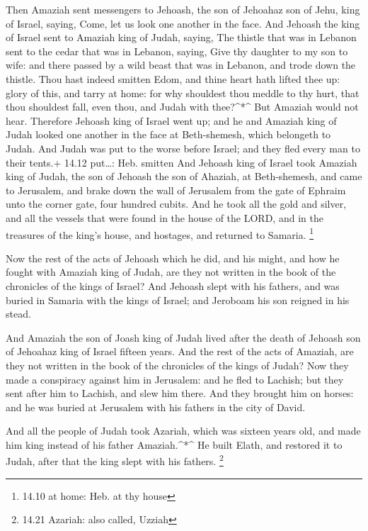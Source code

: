  Then Amaziah sent messengers to Jehoash, the son of
Jehoahaz son of Jehu, king of Israel, saying, Come, let us look one
another in the face.  And Jehoash the king of Israel sent to
Amaziah king of Judah, saying, The thistle that was in Lebanon sent to
the cedar that was in Lebanon, saying, Give thy daughter to my son to
wife: and there passed by a wild beast that was in Lebanon, and trode
down the thistle.  Thou hast indeed smitten Edom, and thine
heart hath lifted thee up: glory of this, and tarry at home: for why
shouldest thou meddle to thy hurt, that thou shouldest fall, even thou,
and Judah with thee?\^{}*\^{}  But Amaziah would not hear.
Therefore Jehoash king of Israel went up; and he and Amaziah king of
Judah looked one another in the face at Beth-shemesh, which belongeth to
Judah.  And Judah was put to the worse before Israel; and
they fled every man to their tents.+ 14.12 put\ldots: Heb. smitten
 And Jehoash king of Israel took Amaziah king of Judah, the
son of Jehoash the son of Ahaziah, at Beth-shemesh, and came to
Jerusalem, and brake down the wall of Jerusalem from the gate of Ephraim
unto the corner gate, four hundred cubits.  And he took all
the gold and silver, and all the vessels that were found in the house of
the LORD, and in the treasures of the king's house, and hostages, and
returned to Samaria. \footnote{14.10 at home: Heb. at thy house}

 Now the rest of the acts of Jehoash which he did, and his
might, and how he fought with Amaziah king of Judah, are they not
written in the book of the chronicles of the kings of Israel?
 And Jehoash slept with his fathers, and was buried in
Samaria with the kings of Israel; and Jeroboam his son reigned in his
stead.

 And Amaziah the son of Joash king of Judah lived after the
death of Jehoash son of Jehoahaz king of Israel fifteen years.
 And the rest of the acts of Amaziah, are they not written
in the book of the chronicles of the kings of Judah?  Now
they made a conspiracy against him in Jerusalem: and he fled to Lachish;
but they sent after him to Lachish, and slew him there. 
And they brought him on horses: and he was buried at Jerusalem with his
fathers in the city of David.

 And all the people of Judah took Azariah, which was
sixteen years old, and made him king instead of his father
Amaziah.\^{}*\^{}  He built Elath, and restored it to
Judah, after that the king slept with his fathers. \footnote{14.21
  Azariah: also called, Uzziah}

